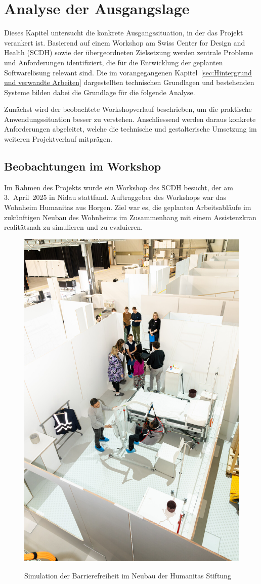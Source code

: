 \section{Analyse der Ausgangslage}

Dieses Kapitel untersucht die konkrete Ausgangssituation, in der das Projekt verankert ist.  
Basierend auf einem Workshop am Swiss Center for Design and Health (SCDH) sowie der übergeordneten Zielsetzung werden zentrale Probleme und Anforderungen identifiziert, die für die Entwicklung der geplanten Softwarelösung relevant sind.  
Die im vorangegangenen Kapitel~\ref{sec:Hintergrund und verwandte Arbeiten} dargestellten technischen Grundlagen und bestehenden Systeme bilden dabei die Grundlage für die folgende Analyse.

Zunächst wird der beobachtete Workshopverlauf beschrieben, um die praktische Anwendungssituation besser zu verstehen. Anschliessend werden daraus konkrete Anforderungen abgeleitet, welche die technische und gestalterische Umsetzung im weiteren Projektverlauf mitprägen.


\subsection{Beobachtungen im Workshop}
\label{sec:workshop}

Im Rahmen des Projekts wurde ein Workshop des SCDH besucht, der am 3.~April~2025 in Nidau stattfand. Auftraggeber des Workshops war das Wohnheim Humanitas aus Horgen. Ziel war es, die geplanten Arbeitsabläufe im zukünftigen Neubau des Wohnheims im Zusammenhang mit einem Assistenzkran realitätsnah zu simulieren und zu evaluieren.

\begin{figure}[H]
  \centering
  \includegraphics[width=0.5\linewidth]{graphics/workshop.jpg}
  \caption{Simulation der Barrierefreiheit im Neubau der Humanitas Stiftung}
  \cite{scdh_humanitas_image_nodate}
  \label{fig:humanitas_image}
\end{figure}
\clearpage


